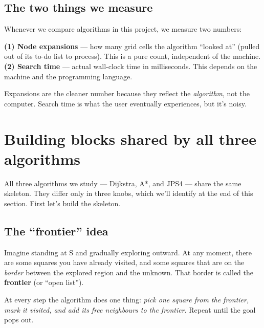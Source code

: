 \documentclass[11pt,a4paper]{article}
\newcommand{\gridbase}[2]{%
  \draw[step=0.6,gray!50,very thin] (0,0) grid (#1*0.6,#2*0.6);
  \draw[black,thick] (0,0) rectangle (#1*0.6,#2*0.6);
}
\newcommand{\fillcell}[3]{%
  \fill[#3] (#1*0.6,#2*0.6) rectangle ({(#1+1)*0.6},{(#2+1)*0.6});
  \draw[gray!50,very thin] (#1*0.6,#2*0.6) rectangle ({(#1+1)*0.6},{(#2+1)*0.6});
}
\newcommand{\celltext}[3]{%
  \node at ({(#1+0.5)*0.6},{(#2+0.5)*0.6}) {\footnotesize #3};
}
\begin{document}
\subsection{The two things we measure}

Whenever we compare algorithms in this project, we measure two numbers:

\begin{keybox}
\textbf{(1) Node expansions} --- how many grid cells the algorithm ``looked at'' (pulled out of its to-do list to process). This is a pure count, independent of the machine.\\[2pt]
\textbf{(2) Search time} --- actual wall-clock time in milliseconds. This depends on the machine and the programming language.
\end{keybox}

\noindent Expansions are the cleaner number because they reflect the \textit{algorithm}, not the computer. Search time is what the user eventually experiences, but it's noisy.

\clearpage
\section{Building blocks shared by all three algorithms}\label{sec:blocks}

All three algorithms we study --- Dijkstra, A*, and JPS4 --- share the same skeleton. They differ only in three knobs, which we'll identify at the end of this section. First let's build the skeleton.

\subsection{The ``frontier'' idea}

Imagine standing at S and gradually exploring outward. At any moment, there are some squares you have already visited, and some squares that are on the \emph{border} between the explored region and the unknown. That border is called the \textbf{frontier} (or ``open list'').

At every step the algorithm does one thing: \textit{pick one square from the frontier, mark it visited, and add its free neighbours to the frontier}. Repeat until the goal pops out.

\begin{center}
\end{center}
\end{document}
